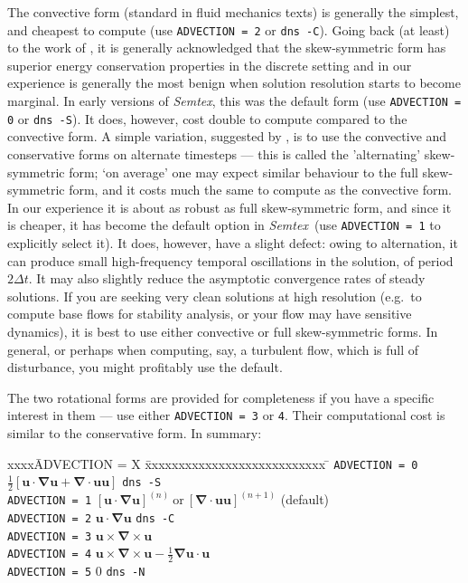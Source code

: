 \documentclass[11pt]{report}
\newcommand{\Semtex}{\emph{Semtex}} \newcommand{\Dog}{\emph{Dog}}
\newcommand{\thalf}{{\textstyle\frac{1}{2}}}
\newcommand{\eg}{e.g.\ } \newcommand{\CC}{\mathrm{c.c.}}
\begin{document}
The convective form (standard in fluid mechanics texts) is generally
the simplest, and cheapest to compute (use \verb+ADVECTION = 2+ or
\verb+dns -C+).  Going back (at least) to the work of \citet{zan91b},
it is generally acknowledged that the skew-symmetric form has superior
energy conservation properties in the discrete setting and in our
experience is generally the most benign when solution resolution
starts to become marginal.  In early versions of \Semtex, this was the
default form (use \verb+ADVECTION = 0+ or \verb+dns -S+).  It does,
however, cost double to compute compared to the convective form.  A
simple variation, suggested by \citet{kerr85}, is to use the
convective and conservative forms on alternate timesteps --- this is
called the 'alternating' skew-symmetric form; `on average' one may
expect similar behaviour to the full skew-symmetric form, and it costs
much the same to compute as the convective form.  In our experience it
is about as robust as full skew-symmetric form, and since it is
cheaper, it has become the default option in \Semtex\ (use
\verb+ADVECTION = 1+ to explicitly select it).  It does, however, have
a slight defect: owing to alternation, it can produce small
high-frequency temporal oscillations in the solution, of period
$2\Delta t$.  It may also slightly reduce the asymptotic convergence
rates of steady solutions.  If you are seeking very clean solutions at
high resolution (\eg to compute base flows for stability analysis, or
your flow may have sensitive dynamics), it is best to use either
convective or full skew-symmetric forms.  In general, or perhaps when
computing, say, a turbulent flow, which is full of disturbance, you
might profitably use the default.

The two rotational forms are provided for completeness if you have a
specific interest in them --- use either \verb+ADVECTION = 3+ or
\verb+4+. Their computational cost is similar to the conservative
form. In summary:
\begin{tabbing}
xxxx\=ADVECTION = X \= xxxxxxxxxxxxxxxxxxxxxxxxxxx \= \kill
\> \verb+ADVECTION = 0+
\> $\thalf[\bm{u\cdot\nabla u}+\bm{\nabla\cdot uu}]$
\> \verb+dns -S+ \\
\> \verb+ADVECTION = 1+
\> $[\bm{u\cdot\nabla u}]^{(n)}~\textrm{or}~[\bm{\nabla\cdot uu}]^{(n+1)}$
\> (default) \\
\> \verb+ADVECTION = 2+
\> $\bm{u\cdot\nabla u}$
\> \verb+dns -C+\\
\> \verb+ADVECTION = 3+
\> $\bm{u}\times\bm{\nabla}\times\bm{u}$ \\
\> \verb+ADVECTION = 4+
\> $\bm{u}\times\bm{\nabla}\times\bm{u} - \thalf\bm{\nabla u\cdot u}$ \\
\> \verb+ADVECTION = 5+
\> $0$
\> \verb+dns -N+
\end{tabbing}
\end{document}
